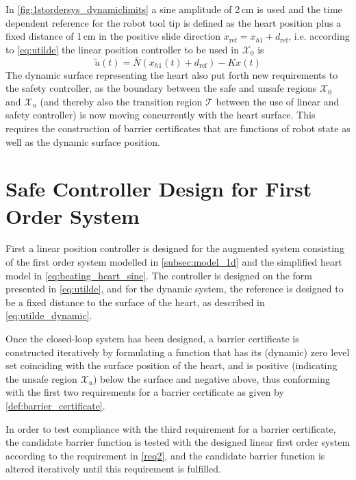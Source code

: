 In \autoref{fig:1stordersys_dynamiclimits} a sine amplitude of 2\,cm is used and the time dependent reference for the robot tool tip is defined as the heart position plus a fixed distance of 1\,cm in the positive slide direction $x_\text{ref}=x_{h1}+d_\text{ref}$, i.e. according to \autoref{eq:utilde} the linear position controller to be used in $\mathcal{X}_0$ is
\begin{equation}
\tilde{u}(t) = \bar{N}(x_{h1}(t)+d_\text{ref})-Kx(t) \label{eq:utilde_dynamic}
\end{equation}
The dynamic surface representing the heart also put forth new requirements to the safety controller, as the boundary between the safe and unsafe regions $\mathcal{X}_0$ and $\mathcal{X}_u$ (and thereby also the transition region $\mathcal{T}$ between the use of linear and safety controller) is now moving concurrently with the heart surface. This requires the construction of barrier certificates that are functions of robot state as well as the dynamic surface position.



\section{Safe Controller Design for First Order System}
First a linear position controller is designed for the augmented system consisting of the first order system modelled in \autoref{subsec:model_1d} and the simplified heart model in \autoref{eq:beating_heart_sine}. The controller is designed on the form presented in \autoref{eq:utilde}, and for the dynamic system, the reference is designed to be a fixed distance to the surface of the heart, as described in \autoref{eq:utilde_dynamic}.

Once the closed-loop system has been designed, a barrier certificate is constructed iteratively by formulating a function that has its (dynamic) zero level set coinciding with the surface position of the heart, and is positive (indicating the unsafe region $\mathcal{X}_u$) below the surface and negative above, thus conforming with the first two requirements for a barrier certificate as given by \autoref{def:barrier_certificate}.

In order to test compliance with the third requirement for a barrier certificate, the candidate barrier function is tested with the designed linear first order system according to the requirement in \autoref{req2}, and the candidate barrier function is altered iteratively until this requirement is fulfilled.

